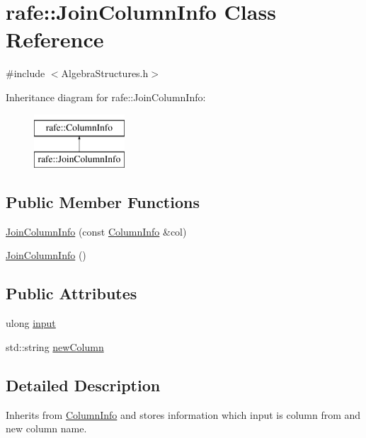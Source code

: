 \hypertarget{classrafe_1_1_join_column_info}{\section{rafe\+:\+:Join\+Column\+Info Class Reference}
\label{classrafe_1_1_join_column_info}
}


{\ttfamily \#include $<$Algebra\+Structures.\+h$>$}

Inheritance diagram for rafe\+:\+:Join\+Column\+Info\+:\begin{figure}[H]
\begin{center}
\leavevmode
\includegraphics[height=2.000000cm]{classrafe_1_1_join_column_info}
\end{center}
\end{figure}
\subsection*{Public Member Functions}
\begin{DoxyCompactItemize}
\item 
\hyperlink{classrafe_1_1_join_column_info_ad9a1047f8f126fdbd6ad0530b852a8cf}{Join\+Column\+Info} (const \hyperlink{classrafe_1_1_column_info}{Column\+Info} \&col)
\item 
\hyperlink{classrafe_1_1_join_column_info_a2e4d6cec5ecfb6dfde9a91d3a9d05660}{Join\+Column\+Info} ()
\end{DoxyCompactItemize}
\subsection*{Public Attributes}
\begin{DoxyCompactItemize}
\item 
ulong \hyperlink{classrafe_1_1_join_column_info_af141ca99e62ec1ac85227b9da443a5f4}{input}
\item 
std\+::string \hyperlink{classrafe_1_1_join_column_info_af79ae87d9170139440abfac3fd89e199}{new\+Column}
\end{DoxyCompactItemize}


\subsection{Detailed Description}
Inherits from \hyperlink{classrafe_1_1_column_info}{Column\+Info} and stores information which input is column from and new column name. 

